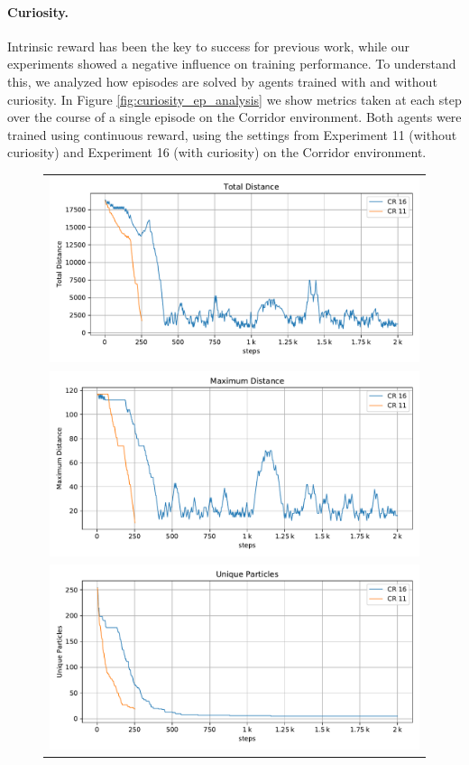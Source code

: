 \paragraph{Curiosity.} Intrinsic reward has been the key to success for previous work, while our experiments showed a negative influence on training performance. To understand this, we analyzed how episodes are solved by agents trained with and without curiosity. In Figure \ref{fig:curiosity_ep_analysis} we show metrics taken at each step over the course of a single episode on the Corridor environment. Both agents were trained using continuous reward, using the settings from Experiment 11 (without curiosity) and Experiment 16 (with curiosity) on the Corridor environment. 

\begin{figure}[htp]
    \begin{center}
        \begin{tabular}{c}
            \includegraphics[clip, width=0.75\columnwidth]{figures/evaluation/rewards/episode_analysis/curiosity_total_distance.pdf} \\
            \includegraphics[clip, width=0.75\columnwidth]{figures/evaluation/rewards/episode_analysis/curiosity_max_distance.pdf} \\
            \includegraphics[clip, width=0.75\columnwidth]{figures/evaluation/rewards/episode_analysis/curiosity_unique_particles.pdf} \\

\end{tabular}
\end{center}
\end{figure}
